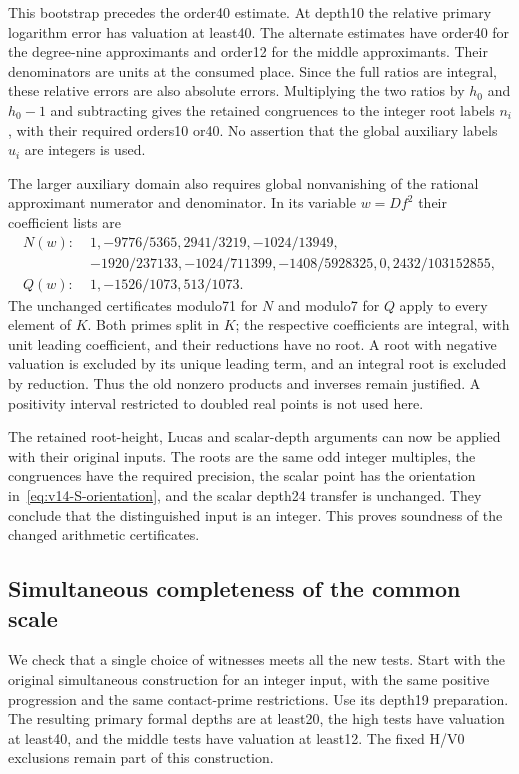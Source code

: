 This bootstrap precedes the order40 estimate. At depth10 the
relative primary logarithm error has valuation at least40.
The alternate estimates have order40 for the degree-nine
approximants and order12 for the middle approximants. Their
denominators are units at the consumed place. Since the full
ratios are integral, these relative errors are also absolute
errors. Multiplying the two ratios by $h_0$ and $h_0-1$ and
subtracting gives the retained congruences to the integer root
labels $n_i$, with their required orders10 or40.
No assertion that the global auxiliary labels $u_i$ are integers
is used.

The larger auxiliary domain also requires global nonvanishing
of the rational approximant numerator and denominator.
In its variable $w=Df^2$ their coefficient lists are
\[
\begin{split}
N(w):\;&1,-9776/5365,2941/3219,-1024/13949,\\
 &-1920/237133,-1024/711399,-1408/5928325,0,
 2432/103152855,\\
Q(w):\;&1,-1526/1073,513/1073 .
\end{split}
\]
The unchanged certificates modulo71 for $N$ and modulo7 for $Q$
apply to every element of $K$. Both primes split in $K$; the
respective coefficients are integral, with unit leading
coefficient, and their reductions have no root. A root with
negative valuation is excluded by its unique leading term,
and an integral root is excluded by reduction. Thus the old
nonzero products and inverses remain justified. A positivity
interval restricted to doubled real points is not used here.

The retained root-height, Lucas and scalar-depth arguments can
now be applied with their original inputs. The roots are the
same odd integer multiples, the congruences have the required
precision, the scalar point has the orientation
in~\eqref{eq:v14-S-orientation}, and the scalar depth24 transfer
is unchanged. They conclude that the distinguished input is
an integer. This proves soundness of the changed arithmetic
certificates.

\subsection{Simultaneous completeness of the common scale}
\label{subsec:v14-completeness}
We check that a single choice of witnesses meets all the new
tests. Start with the original simultaneous construction for
an integer input, with the same positive progression and the
same contact-prime restrictions. Use its depth19 preparation.
The resulting primary formal depths are at least20, the high
tests have valuation at least40, and the middle tests have
valuation at least12. The fixed H/V0 exclusions remain part of
this construction.

